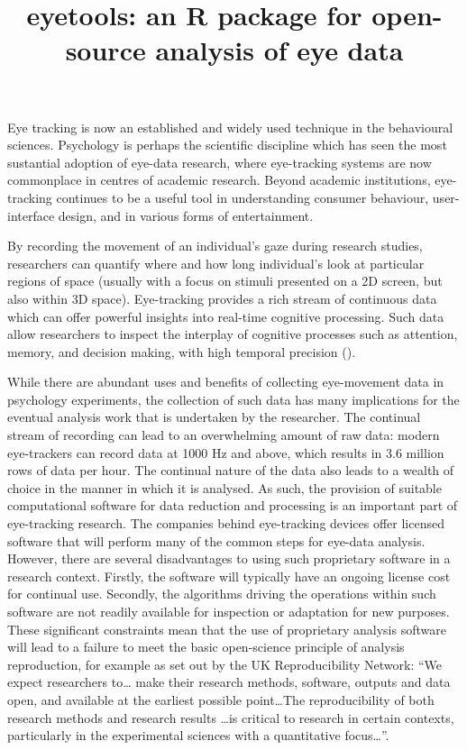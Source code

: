 \documentclass[
  man,
  floatsintext,
  longtable,
  nolmodern,
  notxfonts,
  notimes,
  colorlinks=true,linkcolor=blue,citecolor=blue,urlcolor=blue]{apa7}
\title{eyetools: an R package for open-source analysis of eye data}
\affiliation{
{Lancaster University}}
\begin{document}
\maketitle


\setcounter{secnumdepth}{-\maxdimen} %

\setlength\LTleft{0pt}

\resetlinenumber[1]

Eye tracking is now an established and widely used technique in the
behavioural sciences. Psychology is perhaps the scientific discipline
which has seen the most sustantial adoption of eye-data research, where
eye-tracking systems are now commonplace in centres of academic
research. Beyond academic institutions, eye-tracking continues to be a
useful tool in understanding consumer behaviour, user-interface design,
and in various forms of entertainment.

By recording the movement of an individual's gaze during research
studies, researchers can quantify where and how long individual's look
at particular regions of space (usually with a focus on stimuli
presented on a 2D screen, but also within 3D space). Eye-tracking
provides a rich stream of continuous data which can offer powerful
insights into real-time cognitive processing. Such data allow
researchers to inspect the interplay of cognitive processes such as
attention, memory, and decision making, with high temporal precision
().

While there are abundant uses and benefits of collecting eye-movement
data in psychology experiments, the collection of such data has many
implications for the eventual analysis work that is undertaken by the
researcher. The continual stream of recording can lead to an
overwhelming amount of raw data: modern eye-trackers can record data at
1000 Hz and above, which results in 3.6 million rows of data per hour.
The continual nature of the data also leads to a wealth of choice in the
manner in which it is analysed. As such, the provision of suitable
computational software for data reduction and processing is an important
part of eye-tracking research. The companies behind eye-tracking devices
offer licensed software that will perform many of the common steps for
eye-data analysis. However, there are several disadvantages to using
such proprietary software in a research context. Firstly, the software
will typically have an ongoing license cost for continual use. Secondly,
the algorithms driving the operations within such software are not
readily available for inspection or adaptation for new purposes. These
significant constraints mean that the use of proprietary analysis
software will lead to a failure to meet the basic open-science principle
of analysis reproduction, for example as set out by the UK
Reproducibility Network: ``We expect researchers to\ldots{} make their
research methods, software, outputs and data open, and available at the
earliest possible point\ldots The reproducibility of both research
methods and research results \ldots is critical to research in certain
contexts, particularly in the experimental sciences with a quantitative
focus\ldots{}''.
\end{document}
